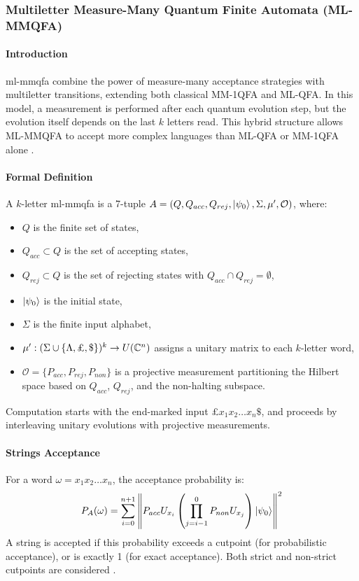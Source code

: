 \subsubsection{Multiletter Measure-Many Quantum Finite Automata (ML-MMQFA)}

\paragraph{Introduction}
\gls{ml-mmqfa} combine the power of measure-many acceptance strategies with multiletter transitions, extending both classical MM-1QFA and ML-QFA. In this model, a measurement is performed after each quantum evolution step, but the evolution itself depends on the last $k$ letters read. This hybrid structure allows ML-MMQFA to accept more complex languages than ML-QFA or MM-1QFA alone \cite{lin2012equivalence}.

\paragraph{Formal Definition}
A $k$-letter \gls{ml-mmqfa} is a 7-tuple $A = (Q, Q_{acc}, Q_{rej}, \ket{\psi_0}, \Sigma, \mu', \mathcal{O})$, where:
\begin{itemize}
    \item $Q$ is the finite set of states,
    \item $Q_{acc} \subset Q$ is the set of accepting states,
    \item $Q_{rej} \subset Q$ is the set of rejecting states with $Q_{acc} \cap Q_{rej} = \emptyset$,
    \item $\ket{\psi_0}$ is the initial state,
    \item $\Sigma$ is the finite input alphabet,
    \item $\mu': (\Sigma \cup \{\Lambda, \text{\textsterling}, \$\})^k \to U(\mathbb{C}^n)$ assigns a unitary matrix to each $k$-letter word,
    \item $\mathcal{O} = \{P_{acc}, P_{rej}, P_{non}\}$ is a projective measurement partitioning the Hilbert space based on $Q_{acc}$, $Q_{rej}$, and the non-halting subspace.
\end{itemize}
Computation starts with the end-marked input £$x_1x_2 \dots x_n\$$, and proceeds by interleaving unitary evolutions with projective measurements.

\paragraph{Strings Acceptance}
For a word $\omega = x_1 x_2 \dots x_n$, the acceptance probability is:
\[
P_A(\omega) = \sum_{i=0}^{n+1} \left\| P_{acc} U_{x_i} \left( \prod_{j=i-1}^{0} P_{non} U_{x_j} \right) \ket{\psi_0} \right\|^2
\]
A string is accepted if this probability exceeds a cutpoint (for probabilistic acceptance), or is exactly 1 (for exact acceptance). Both strict and non-strict cutpoints are considered \cite{lin2012equivalence}.

